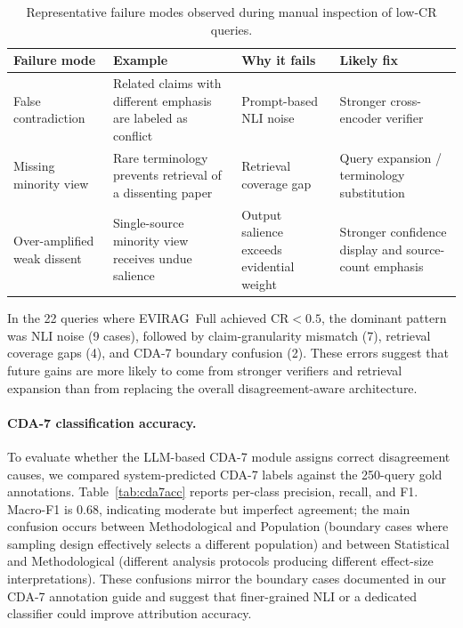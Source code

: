 \documentclass[11pt]{article}
\newcommand{\system}{\textsc{EVIRAG}\xspace}
\begin{document}
\begin{table}[!htbp]
\centering\small
\setlength{\tabcolsep}{5pt}
\begin{tabular}{@{}p{3.0cm} p{4.1cm} p{3.2cm} p{4.1cm}@{}}
\toprule
\textbf{Failure mode} & \textbf{Example} & \textbf{Why it fails} & \textbf{Likely fix} \\
\midrule
False contradiction & Related claims with different emphasis are labeled as conflict & Prompt-based NLI noise & Stronger cross-encoder verifier \\
Missing minority view & Rare terminology prevents retrieval of a dissenting paper & Retrieval coverage gap & Query expansion / terminology substitution \\
Over-amplified weak dissent & Single-source minority view receives undue salience & Output salience exceeds evidential weight & Stronger confidence display and source-count emphasis \\
\bottomrule
\end{tabular}
\caption{Representative failure modes observed during manual inspection of
low-CR queries.}
\label{tab:failuremodes}
\end{table}

In the 22 queries where \system\ Full achieved CR$<0.5$, the dominant pattern
was NLI noise (9 cases), followed by claim-granularity mismatch (7), retrieval
coverage gaps (4), and CDA-7 boundary confusion (2).  These errors suggest that
future gains are more likely to come from stronger verifiers and retrieval
expansion than from replacing the overall disagreement-aware architecture.

\paragraph{CDA-7 classification accuracy.}
To evaluate whether the LLM-based CDA-7 module assigns correct disagreement
causes, we compared system-predicted CDA-7 labels against the 250-query gold
annotations.  Table~\ref{tab:cda7acc} reports per-class precision, recall, and
F1.  Macro-F1 is $0.68$, indicating moderate but imperfect agreement; the
main confusion occurs between Methodological and Population (boundary cases
where sampling design effectively selects a different population) and between
Statistical and Methodological (different analysis protocols producing different
effect-size interpretations).  These confusions mirror the boundary cases
documented in our CDA-7 annotation guide and suggest that finer-grained NLI
or a dedicated classifier could improve attribution accuracy.
\end{document}
